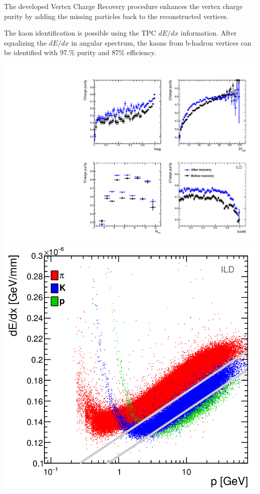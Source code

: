 \color{DarkSlateGray}
The developed Vertex Charge Recovery procedure enhances the vertex charge purity by adding the missing particles back to the reconstructed vertices. 


The kaon identification is possible using the TPC $dE/dx$ information. After equalizing the $dE/dx$ in angular spectrum, the kaons from b-hadron vertices can be identified with 97.\% purity and 87\% efficiency.
\begin{center}\vspace{1cm}
	
	\includegraphics[clip, trim=10cm 0cm 0cm 10cm,width=0.4\linewidth]{plots/purity-recovery-ild.pdf}\label{fig:Charges_a_3}
	\includegraphics[width=0.37\linewidth]{plots/dedx2.png}\label{fig:Charges_b_3}
	\label{fig:Charges_3}
\end{center}\vspace{1cm}



